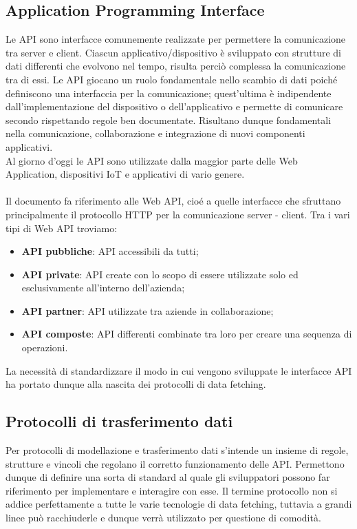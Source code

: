 \subsection*{Application Programming Interface}
 Le API sono interfacce comunemente realizzate per permettere la comunicazione tra server e client. Ciascun applicativo/dispositivo è sviluppato con strutture di dati differenti che evolvono nel tempo, risulta perciò complessa la comunicazione tra di essi. Le API giocano un ruolo fondamentale nello scambio di dati poiché definiscono una interfaccia per la comunicazione; quest'ultima è indipendente dall'implementazione del dispositivo o dell'applicativo e permette di comunicare secondo rispettando regole ben documentate. Risultano dunque fondamentali nella comunicazione, collaborazione e integrazione di nuovi componenti applicativi.\\
 Al giorno d'oggi le API sono utilizzate dalla maggior parte delle Web Application, dispositivi IoT e applicativi di vario genere.\\ \\
 Il documento fa riferimento alle Web API, cioé a quelle interfacce che sfruttano principalmente il protocollo HTTP per la comunicazione server - client. Tra i vari tipi di Web API troviamo:
 \begin{itemize}
   \item \textbf{API pubbliche}: API accessibili da tutti;
   \item \textbf{API private}: API create con lo scopo di essere utilizzate solo ed esclusivamente all'interno dell'azienda;
   \item \textbf{API partner}: API utilizzate tra aziende in collaborazione;
   \item \textbf{API composte}: API differenti combinate tra loro per creare una sequenza di operazioni.
 \end{itemize}
La necessità di standardizzare il modo in cui vengono sviluppate le interfacce API ha portato dunque alla nascita dei protocolli di data fetching.
\subsection*{Protocolli di trasferimento dati}
Per protocolli di modellazione e trasferimento dati s'intende un insieme di regole, strutture e vincoli che regolano il corretto funzionamento delle API. Permettono dunque di definire una sorta di standard al quale gli sviluppatori possono far riferimento per implementare e interagire con esse. Il termine protocollo non si addice perfettamente a tutte le varie tecnologie di data fetching, tuttavia a grandi linee può racchiuderle e dunque verrà utilizzato per questione di comodità.
